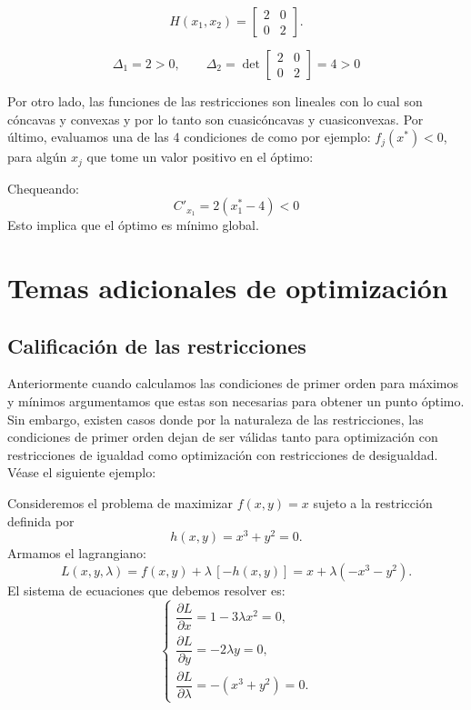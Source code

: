\documentclass{article}
\begin{document}
\[
H(x_1,x_2)=
\begin{bmatrix}
2 & 0\\
0 & 2
\end{bmatrix}.
\]

\[
\Delta_1=2>0,\qquad
\Delta_2=\det\!\begin{bmatrix}2&0\\0&2\end{bmatrix}=4>0
\]


Por otro lado, las funciones de las restricciones son lineales con lo cual son cóncavas y convexas y por lo tanto son cuasicóncavas y cuasiconvexas. Por último, evaluamos una de las 4 condiciones de como por ejemplo: $f_j(x^*)<0$, para algún $x_j$ que tome un valor positivo en el óptimo:

Chequeando:
\begin{equation*}
C'_{x_1}=2(x_1^*-4)<0
\end{equation*}
Esto implica que el óptimo es mínimo global.



\newpage


\section{Temas adicionales de optimización}




\subsection*{Calificación de las restricciones}
Anteriormente cuando calculamos las condiciones de primer orden para máximos y mínimos argumentamos que estas son necesarias para obtener un punto óptimo. Sin embargo, existen casos donde por la naturaleza de las restricciones, las condiciones de primer orden dejan de ser válidas tanto para optimización con restricciones de igualdad como optimización con restricciones de desigualdad. Véase el siguiente ejemplo:

Consideremos el problema de maximizar \( f(x,y) = x \) sujeto a la restricción 
definida por 
\[
h(x,y) = x^3 + y^2 = 0.
\]
Armamos el lagrangiano:
\[
L(x,y,\lambda) = f(x,y) + \lambda\,[-h(x,y)] 
= x + \lambda(-x^3 - y^2).
\]
El sistema de ecuaciones que debemos resolver es:
\[
\begin{cases}
\dfrac{\partial L}{\partial x} = 1 - 3\lambda x^2 = 0, \\[1em]
\dfrac{\partial L}{\partial y} = -2\lambda y = 0, \\[1em]
\dfrac{\partial L}{\partial \lambda} = -(x^3 + y^2) = 0.
\end{cases}
\]
\end{document}
